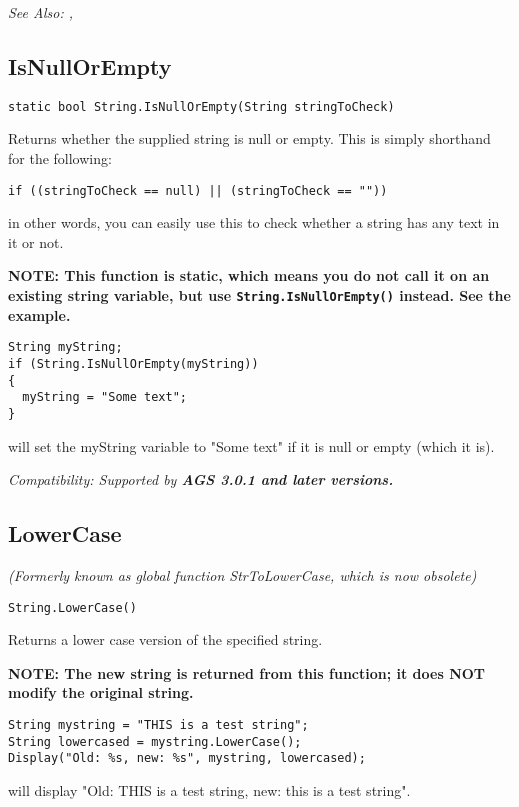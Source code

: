 \it{See Also:} ,


\subsection{IsNullOrEmpty}\label{String.IsNullOrEmpty}%

\begin{verbatim}
static bool String.IsNullOrEmpty(String stringToCheck)
\end{verbatim}
Returns whether the supplied string is null or empty. This is simply shorthand for the following:
\begin{verbatim}
if ((stringToCheck == null) || (stringToCheck == ""))
\end{verbatim}
in other words, you can easily use this to check whether a string has any text in it or not.

\bf{NOTE:} This function is static, which means you do not call it on an existing
string variable, but use \verb$String.IsNullOrEmpty()$ instead. See the example.

\begin{verbatim}
String myString;
if (String.IsNullOrEmpty(myString))
{
  myString = "Some text";
}
\end{verbatim}
will set the myString variable to "Some text" if it is null or empty (which it is).

\it{Compatibility:} Supported by \bf{AGS 3.0.1} and later versions.


\subsection{LowerCase}\label{String.LowerCase}%

\it{(Formerly known as global function StrToLowerCase, which is now obsolete)}

\begin{verbatim}
String.LowerCase()
\end{verbatim}
Returns a lower case version of the specified string.

\bf{NOTE:} The new string is returned from this function; it
does \bf{NOT} modify the original string.

\begin{verbatim}
String mystring = "THIS is a test string";
String lowercased = mystring.LowerCase();
Display("Old: %s, new: %s", mystring, lowercased);
\end{verbatim}
will display "Old: THIS is a test string, new: this is a test string".

